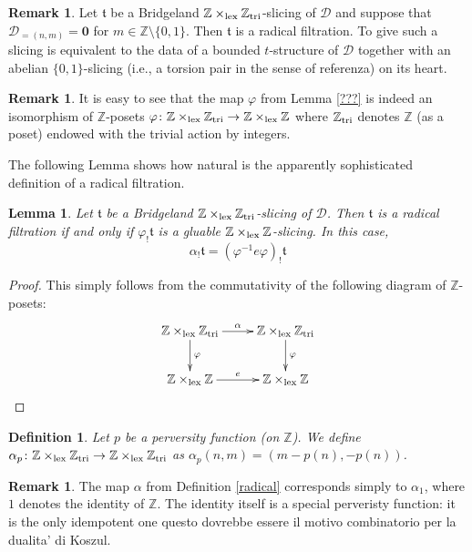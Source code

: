\documentclass{article}
\newtheorem{lem}[thm]{Lemma}
\newtheorem{defn}[thm]{Definition}
\theoremstyle{definition}
\newtheorem{rem}[thm]{Remark}
\newcommand{\Z}{\mathbb{Z}}
\newcommand{\tee}{\mathfrak{t}}
\newcommand{\lex}{\times_{\textnormal{lex}}}
\newcommand{\triv}{\mathbb{Z}_{\textnormal{tri}}}
\begin{document}
\begin{rem}
Let $\tee$ be a  Bridgeland $\Z \lex \triv$-slicing of $\mathscr{D}$ and suppose that $\mathscr{D}_{=(n,m)}= \mathbf{0}$ for $m \in \Z \setminus \{ 0,1 \}$. Then $\tee$ is a radical filtration. To give such a slicing is equivalent to the data of a bounded $t$-structure of $\mathscr{D}$ together with an abelian $\{0,1\}$-slicing (i.e., a torsion pair in the sense of {\color{red}referenza}) on its heart.
\end{rem}

\begin{rem}
It is easy to see that the map $\varphi$ from Lemma \ref{???} is indeed an isomorphism of $\mathbb{Z}$-posets $\varphi \colon \Z \lex \triv \to \Z \lex \Z$ where $\triv$ denotes $\Z$ (as a poset) endowed with the  trivial action by integers. 
\end{rem}

The following Lemma shows how natural is the apparently sophisticated definition of a radical filtration. 

\begin{lem}
  Let $\tee$ be a  Bridgeland $\Z \lex \triv$-slicing of $\mathscr{D}$. Then $\tee$ is a radical filtration if and only if $\varphi_! \tee$ is a gluable $\Z \lex \Z$-slicing. In this case,
  \[
  \alpha_! \tee = ( \varphi^{-1} e \varphi)_! \tee
  \]
\end{lem}

\begin{proof}
  This simply follows from the commutativity of the following diagram of $\Z$-posets:
  \[
\xymatrix{
\Z \lex \triv \ar[r]^{\alpha} \ar[d]^{\varphi} & \Z \lex \triv \ar[d]^{\varphi} \\
\Z \lex \Z \ar[r]^{e} & \Z \lex \Z 
}
\]
\end{proof}

\begin{defn}
  Let $p$ be a perversity function (on $\Z$). We define $\alpha_p \colon \Z \lex \triv \to \Z \lex \triv$ as $\alpha_p(n,m)=(m-p(n),-p(n))$. 
\end{defn}

\begin{rem}
The map $\alpha$ from Definition \ref{radical} corresponds simply to $\alpha_1$, where $1$ denotes the identity of $\mathbb{Z}$. The identity itself is a special perveristy function: it is the only idempotent one {\color{red} questo dovrebbe essere il motivo combinatorio per la dualita' di Koszul}. 
\end{rem}
\end{document}

